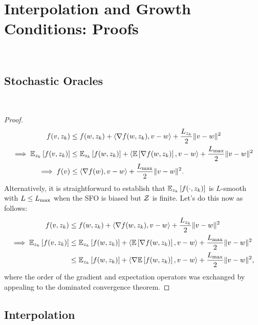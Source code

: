 
\chapter{Interpolation and Growth Conditions: Proofs}~\label{app:interpolation-gc}

\section{Stochastic Oracles}~\label{app:stochastic-oracles}

\indSmoothToSmooth*
\begin{proof}
\begin{align*}
    f(v, z_{k}) &\leq f(w, z_{k}) + \left\langle\nabla f(w, z_{k}), v - w\right\rangle + \frac{L_{z_{k}}}{2} \|v - w\|^2\\
    \implies \mathbb{E}_{z_{k}} \left[f(v, z_{k})\right] &\leq \mathbb{E}_{z_{k}} \left[f(w, z_{k})\right] + \left\langle\mathbb{E}\left[\nabla f(w, z_{k})\right], v - w\right\rangle + \frac{L_{\text{max}}}{2} \|v - w\|^2\\
    \implies f(v) &\leq \left\langle\nabla f(w), v - w\right\rangle + \frac{L_{\text{max}}}{2}\|v - w\|^2. 
\end{align*}
Alternatively, it is straightforward to establish that \( \mathbb{E}_{z_{k}} \left[f(\cdot, z_{k})\right] \) is \( L \)-smooth with \( L \leq L_{\text{max}} \) when the SFO is biased but \( \mathcal{Z} \) is finite.
Let's do this now as follows:
\begin{align*}
    f(v, z_{k}) &\leq f(w, z_{k}) + \left\langle\nabla f(w, z_{k}), v - w\right\rangle + \frac{L_{z_{k}}}{2} \|v - w\|^2\\
    \implies \mathbb{E}_{z_{k}} \left[f(v, z_{k})\right] &\leq \mathbb{E}_{z_{k}} \left[f(w, z_{k})\right] + \left\langle\mathbb{E}\left[\nabla f(w, z_{k})\right], v - w\right\rangle + \frac{L_{\text{max}}}{2} \|v - w\|^2\\
                                 &\leq \mathbb{E}_{z_{k}} \left[f(w, z_{k})\right] + \left\langle\nabla \mathbb{E}\left[f(w, z_{k})\right], v - w\right\rangle + \frac{L_{\text{max}}}{2} \|v - w\|^2,
\end{align*}
where the order of the gradient and expectation operators was exchanged by appealing to the dominated convergence theorem.
\end{proof}

\section{Interpolation}~\label{app:interpolation}

